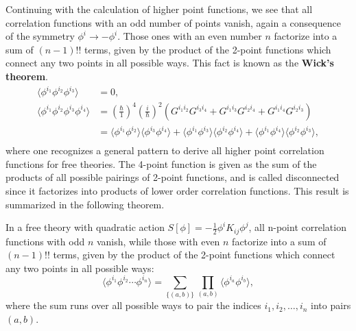 Continuing with the calculation of higher point functions, we see that all correlation functions with an odd number of points vanish, again a consequence of the symmetry \(\phi^i \to -\phi^i\). Those ones with an even number \(n\) factorize into a sum of \((n-1)!!\) terms, given by the product of the 2-point functions which connect any two points in all possible ways. This fact is known as the \textbf{Wick’s theorem}.
\[
    \begin{aligned}
        \langle \phi^{i_1} \phi^{i_2} \phi^{i_3} \rangle            & = 0,                                                                                                                                                                                                                                       \\
        \langle \phi^{i_1} \phi^{i_2} \phi^{i_3} \phi^{i_4} \rangle & = \left(\frac{\hbar}{1}\right)^{4}\left(\frac{i}{\hbar}\right)^2 \left( G^{i_1 i_2} G^{i_3 i_4} + G^{i_1 i_3} G^{i_2 i_4} + G^{i_1 i_4} G^{i_2 i_3} \right)                                                                                \\
                                                                    & = \langle \phi^{i_1} \phi^{i_2} \rangle \langle \phi^{i_3} \phi^{i_4} \rangle + \langle \phi^{i_1} \phi^{i_3} \rangle \langle \phi^{i_2} \phi^{i_4} \rangle + \langle \phi^{i_1} \phi^{i_4} \rangle \langle \phi^{i_2} \phi^{i_3} \rangle, \\
    \end{aligned}
\]
where one recognizes a general pattern to derive all higher point correlation functions for free theories. The 4-point function is given as the sum of the products of all possible pairings of 2-point functions, and is called disconnected since it factorizes into products of lower order correlation functions. This result is summarized in the following theorem.
\begin{theorem}
    In a free theory with quadratic action \(S[\phi] = -\frac{1}{2} \phi^i K_{ij} \phi^j\), all n-point correlation functions with odd \(n\) vanish, while those with even \(n\) factorize into a sum of \((n-1)!!\) terms, given by the product of the 2-point functions which connect any two points in all possible ways:
    \[
        \langle \phi^{i_1} \phi^{i_2} \cdots \phi^{i_n} \rangle = \sum_{\{(a,b)\}} \prod_{(a,b)} \langle \phi^{i_a} \phi^{i_b} \rangle,
    \]
    where the sum runs over all possible ways to pair the indices \(i_1, i_2, \ldots, i_n\) into pairs \((a,b)\).
\end{theorem}

